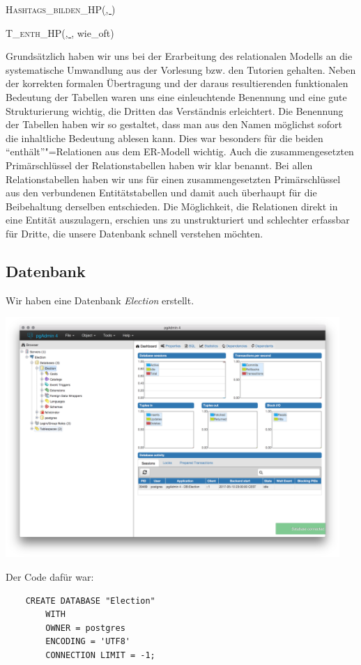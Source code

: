 \documentclass[BCOR0mm,fontsize=12pt,paper=a4,final,numbers=noenddot]{scrartcl}
\begin{document}
\noindent\textsc{Hashtags\_bilden\_HP}(\uline{, })

\noindent\textsc{T\_enth\_HP}(\uline{, }, wie\_oft)

\medskip\noindent{}Grundsätzlich haben wir uns bei der Erarbeitung des relationalen Modells an die systematische Umwandlung aus der Vorlesung bzw. den Tutorien gehalten. Neben der korrekten formalen Übertragung und der daraus resultierenden funktionalen Bedeutung der Tabellen waren uns eine einleuchtende Benennung und eine gute Strukturierung wichtig, die Dritten das Verständnis erleichtert. Die Benennung der Tabellen haben wir so gestaltet, dass man aus den Namen möglichst sofort die inhaltliche Bedeutung ablesen kann. Dies war besonders für die beiden "`enthält"'"=Relationen aus dem ER-Modell wichtig. Auch die zusammengesetzten Primärschlüssel der Relationstabellen haben wir klar benannt. Bei allen Relationstabellen haben wir uns für einen zusammengesetzten Primärschlüssel aus den verbundenen Entitätstabellen und damit auch überhaupt für die Beibehaltung derselben entschieden. Die Möglichkeit, die Relationen direkt in eine Entität auszulagern, erschien uns zu unstrukturiert und schlechter erfassbar für Dritte, die unsere Datenbank schnell verstehen möchten. 

\clearpage

\subsection{Datenbank}
Wir haben eine Datenbank \textit{Election} erstellt.

\includegraphics[width=0.95\textwidth]{datenbank_beweis.png}

Der Code dafür war:
\begin{verbatim}
	CREATE DATABASE "Election"
	    WITH 
	    OWNER = postgres
	    ENCODING = 'UTF8'
	    CONNECTION LIMIT = -1;
\end{verbatim}
\end{document}
